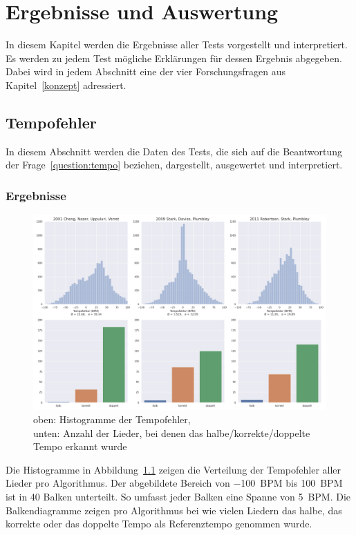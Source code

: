 \chapter{Ergebnisse und Auswertung}
\label{ergebnisse}
\acresetall

In diesem Kapitel werden die Ergebnisse aller Tests vorgestellt und interpretiert.
Es werden zu jedem Test mögliche Erklärungen für dessen Ergebnis abgegeben.
Dabei wird in jedem Abschnitt eine der vier Forschungsfragen aus Kapitel~\ref{konzept} adressiert.

\section{Tempofehler}
{
	In diesem Abschnitt werden die Daten des Tests,
		die sich auf die Beantwortung der Frage~\ref{question:tempo} beziehen,
		dargestellt, ausgewertet und interpretiert.

	\subsection{Ergebnisse}
	{
		\begin{figure}[h]
			\hspace{-17mm}
			\includegraphics[scale=0.4]{resources/tempo_error_histogram.png}
			\caption{
				oben: Histogramme der Tempofehler, \\
				unten: Anzahl der Lieder, bei denen das halbe/korrekte/doppelte Tempo erkannt wurde
			}
			\label{fig:tempoerror}
		\end{figure}

		Die Histogramme in Abbildung~\ref{fig:tempoerror} zeigen die Verteilung der Tempofehler aller Lieder pro Algorithmus.
		Der abgebildete Bereich von \SI{-100}{\ac{BPM}} bis \SI{100}{\ac{BPM}} ist in \num{40} Balken unterteilt.
		So umfasst jeder Balken eine Spanne von \SI{5}{\ac{BPM}}.
		Die Balkendiagramme zeigen pro Algorithmus
			bei wie vielen Liedern das halbe, das korrekte oder das doppelte Tempo als Referenztempo genommen wurde.

}}
